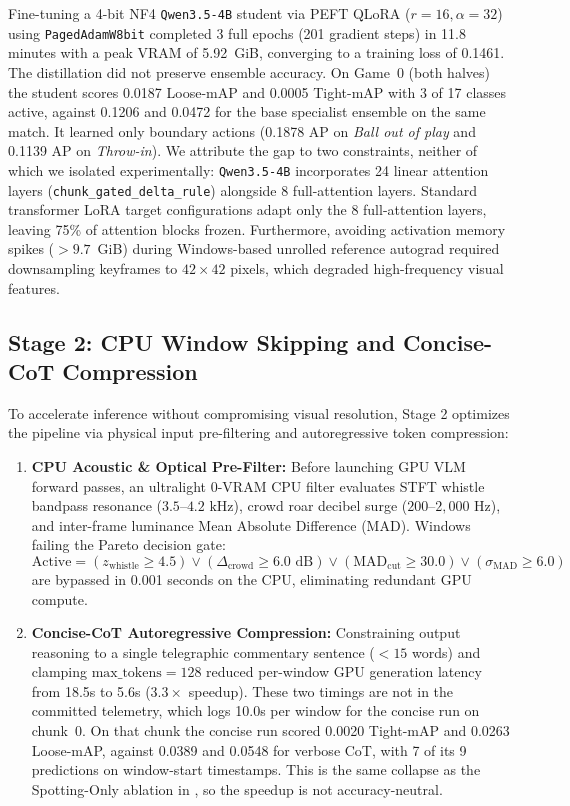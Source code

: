 \documentclass[10pt,twocolumn,letterpaper]{article}
\begin{document}
Fine-tuning a 4-bit NF4 \texttt{Qwen3.5-4B} student via PEFT QLoRA ($r=16, \alpha=32$) using \texttt{PagedAdamW8bit} completed 3 full epochs (201 gradient steps) in 11.8 minutes with a peak VRAM of 5.92~GiB, converging to a training loss of 0.1461. The distillation did not preserve ensemble accuracy. On Game~0 (both halves) the student scores 0.0187 Loose-mAP and 0.0005 Tight-mAP with 3 of 17 classes active, against 0.1206 and 0.0472 for the base specialist ensemble on the same match. It learned only boundary actions (0.1878 AP on \textit{Ball out of play} and 0.1139 AP on \textit{Throw-in}). We attribute the gap to two constraints, neither of which we isolated experimentally: \texttt{Qwen3.5-4B} incorporates 24 linear attention layers (\texttt{chunk\_gated\_delta\_rule}) alongside 8 full-attention layers. Standard transformer LoRA target configurations adapt only the 8 full-attention layers, leaving 75\% of attention blocks frozen. Furthermore, avoiding activation memory spikes ($>9.7$~GiB) during Windows-based unrolled reference autograd required downsampling keyframes to $42 \times 42$ pixels, which degraded high-frequency visual features.

\subsection{Stage 2: CPU Window Skipping and Concise-CoT Compression}
To accelerate inference without compromising visual resolution, Stage 2 optimizes the pipeline via physical input pre-filtering and autoregressive token compression:
\begin{enumerate}
    \item \textbf{CPU Acoustic \& Optical Pre-Filter:} Before launching GPU VLM forward passes, an ultralight 0-VRAM CPU filter evaluates STFT whistle bandpass resonance ($3.5\text{--}4.2\text{ kHz}$), crowd roar decibel surge ($200\text{--}2,000\text{ Hz}$), and inter-frame luminance Mean Absolute Difference (MAD). Windows failing the Pareto decision gate:
    \begin{equation}
        \text{Active} = (z_{\text{whistle}} \ge 4.5) \lor (\Delta_{\text{crowd}} \ge 6.0\text{ dB}) \lor (\text{MAD}_{\text{cut}} \ge 30.0) \lor (\sigma_{\text{MAD}} \ge 6.0)
    \end{equation}
    are bypassed in 0.001 seconds on the CPU, eliminating redundant GPU compute.
    \item \textbf{Concise-CoT Autoregressive Compression:} Constraining output reasoning to a single telegraphic commentary sentence ($<15$ words) and clamping $\text{max\_tokens}=128$ reduced per-window GPU generation latency from 18.5s to 5.6s ($3.3\times$ speedup). These two timings are not in the committed telemetry, which logs 10.0s per window for the concise run on chunk~0. On that chunk the concise run scored 0.0020 Tight-mAP and 0.0263 Loose-mAP, against 0.0389 and 0.0548 for verbose CoT, with 7 of its 9 predictions on window-start timestamps. This is the same collapse as the Spotting-Only ablation in , so the speedup is not accuracy-neutral.
\end{enumerate}
\end{document}
